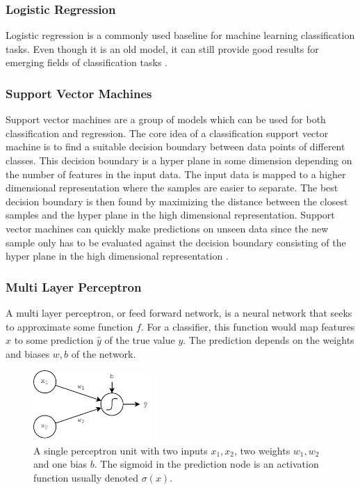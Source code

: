 \subsubsection*{Logistic Regression}

Logistic regression is a commonly used baseline for machine learning classification tasks. Even though it is an old model, it can still provide good results for emerging fields of classification tasks \citep{chollet2017deep}. 

\subsubsection*{Support Vector Machines}

Support vector machines are a group of models which can be used for both classification and regression. The core idea of a classification support vector machine is to find a suitable decision boundary between data points of different classes. This decision boundary is a hyper plane in some dimension depending on the number of features in the input data. The input data is mapped to a higher dimensional representation where the samples are easier to separate. The best decision boundary is then found by maximizing the distance between the closest samples and the hyper plane in the high dimensional representation. Support vector machines can quickly make predictions on unseen data since the new sample only has to be evaluated against the decision boundary consisting of the hyper plane in the high dimensional representation \citep{chollet2017deep}.   



\subsubsection*{Multi Layer Perceptron}

A multi layer perceptron, or feed forward network, is a neural network that seeks to approximate some function $f$. For a classifier, this function would map features $x$ to some prediction $\hat{y}$ of the true value $y$. The prediction depends on the weights and biases $w,b$ of the network.  


\begin{figure}[H]
    \centering
    \includegraphics[width=0.4\textwidth]{Figures/figs-perceptron.pdf}
    \caption{A single perceptron unit with two inputs $x_1, x_2$, two weights $w_1, w_2$ and one bias $b$. The sigmoid in the prediction node is an activation function usually denoted $\sigma(x)$.}
    \label{fig:perceptron}
\end{figure}


